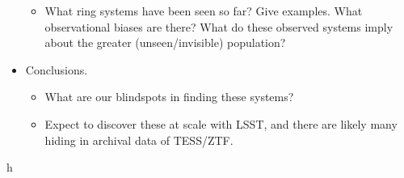 \documentclass[%
 reprint,
 amsmath,amssymb,
 aps,
rmp,
floatfix,
]{revtex4-2}
\begin{document}
\begin{itemize}
\begin{itemize}
        \item What ring systems have been seen so far? Give examples. What observational biases are there? What do these observed systems imply about the greater (unseen/invisible) population? 
    \end{itemize}
    \item Conclusions.
    \begin{itemize}
        \item What are our blindspots in finding these systems?
        \item Expect to discover these at scale with LSST, and there are likely many hiding in archival data of TESS/ZTF. 
    \end{itemize}
\end{itemize}




\begin{acknowledgments}
h
\end{acknowledgments}




% 
\end{document}

